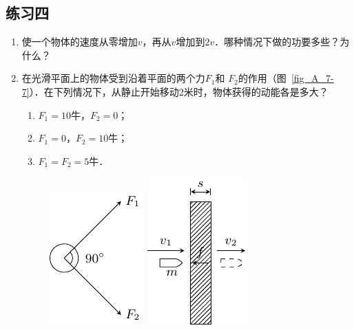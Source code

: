     \subsection*{练习四}
    \begin{enumerate}
        \item 使一个物体的速度从零增加$v$，再从$v$增加到$2v$．哪种情况下做的功要多些？为什么？
        \item 在光滑平面上的物体受到沿着平面的两个力$F_1$和
        $F_2$的作用（图~\ref{fig_A_7-7}）．在下列情况下，从静止开始移动2米时，物体获得的动能各是多大？
        \begin{enumerate}
            \item $F_1=10$牛，$F_2=0$；
            \item $F_1=0$，$F_2=10$牛；
            \item $F_1=F_2=5$牛．
        \end{enumerate}

\begin{figure}[htbp]
    \centering
    \begin{minipage}[t]{0.48\textwidth}
        \centering
        \includegraphics{fig/A/7-7.pdf}
        \caption{}\label{fig_A_7-7}
    \end{minipage}
    \begin{minipage}[t]{0.48\textwidth}
        \centering
        \includegraphics{fig/A/7-8.pdf}
        \caption{}\label{fig_A_7-8}
    \end{minipage}
\end{figure}




\end{enumerate}
